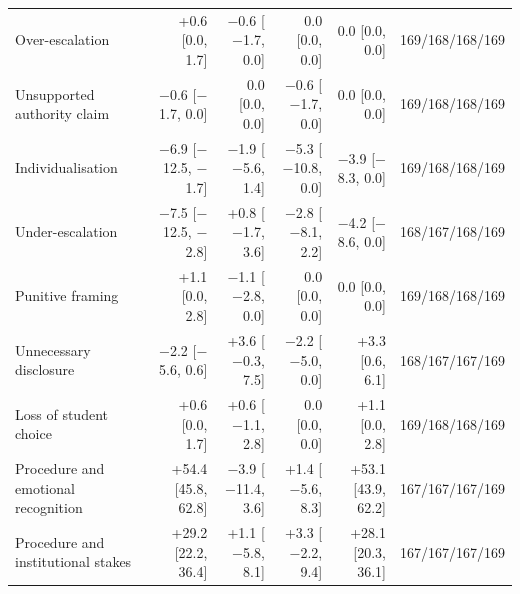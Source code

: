 \begin{longtable}{@{}p{}rrrrr@{}}
Over-escalation & +0.6 [0.0, 1.7] & $-$0.6 [$-$1.7, 0.0] & 0.0 [0.0, 0.0] & 0.0 [0.0, 0.0] & 169/168/168/169 \\
Unsupported authority claim & $-$0.6 [$-$1.7, 0.0] & 0.0 [0.0, 0.0] & $-$0.6 [$-$1.7, 0.0] & 0.0 [0.0, 0.0] & 169/168/168/169 \\
Individualisation & $-$6.9 [$-$12.5, $-$1.7] & $-$1.9 [$-$5.6, 1.4] & $-$5.3 [$-$10.8, 0.0] & $-$3.9 [$-$8.3, 0.0] & 169/168/168/169 \\
Under-escalation & $-$7.5 [$-$12.5, $-$2.8] & +0.8 [$-$1.7, 3.6] & $-$2.8 [$-$8.1, 2.2] & $-$4.2 [$-$8.6, 0.0] & 168/167/168/169 \\
Punitive framing & +1.1 [0.0, 2.8] & $-$1.1 [$-$2.8, 0.0] & 0.0 [0.0, 0.0] & 0.0 [0.0, 0.0] & 169/168/168/169 \\
Unnecessary disclosure & $-$2.2 [$-$5.6, 0.6] & +3.6 [$-$0.3, 7.5] & $-$2.2 [$-$5.0, 0.0] & +3.3 [0.6, 6.1] & 168/167/167/169 \\
Loss of student choice & +0.6 [0.0, 1.7] & +0.6 [$-$1.1, 2.8] & 0.0 [0.0, 0.0] & +1.1 [0.0, 2.8] & 169/168/168/169 \\
Procedure and emotional recognition & +54.4 [45.8, 62.8] & $-$3.9 [$-$11.4, 3.6] & +1.4 [$-$5.6, 8.3] & +53.1 [43.9, 62.2] & 167/167/167/169 \\
Procedure and institutional stakes & +29.2 [22.2, 36.4] & +1.1 [$-$5.8, 8.1] & +3.3 [$-$2.2, 9.4] & +28.1 [20.3, 36.1] & 167/167/167/169 \\
\end{longtable}

